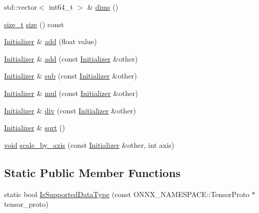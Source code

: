 \begin{DoxyCompactItemize}
std\+::vector$<$ int64\+\_\+t $>$ \& \mbox{\hyperlink{classonnxruntime_1_1Initializer_ab2b877ef9dd53feb7e90397de14be12a}{dims}} ()
\item 
\mbox{\hyperlink{mlasi_8h_a503efbc1c6e50825320ad909366b78ab}{size\+\_\+t}} \mbox{\hyperlink{classonnxruntime_1_1Initializer_a77022bec74ca93ec68e54c85e085c093}{size}} () const
\item 
\mbox{\hyperlink{classonnxruntime_1_1Initializer}{Initializer}} \& \mbox{\hyperlink{classonnxruntime_1_1Initializer_ab26cacacf0f3b221fde86c176bbc97f1}{add}} (float value)
\item 
\mbox{\hyperlink{classonnxruntime_1_1Initializer}{Initializer}} \& \mbox{\hyperlink{classonnxruntime_1_1Initializer_af7ae55957c741495c4520f29ff2381ca}{add}} (const \mbox{\hyperlink{classonnxruntime_1_1Initializer}{Initializer}} \&other)
\item 
\mbox{\hyperlink{classonnxruntime_1_1Initializer}{Initializer}} \& \mbox{\hyperlink{classonnxruntime_1_1Initializer_a20381c51daf3386b459ca6cbbd770fb5}{sub}} (const \mbox{\hyperlink{classonnxruntime_1_1Initializer}{Initializer}} \&other)
\item 
\mbox{\hyperlink{classonnxruntime_1_1Initializer}{Initializer}} \& \mbox{\hyperlink{classonnxruntime_1_1Initializer_a5a782f94351a5873490294817ff9ee04}{mul}} (const \mbox{\hyperlink{classonnxruntime_1_1Initializer}{Initializer}} \&other)
\item 
\mbox{\hyperlink{classonnxruntime_1_1Initializer}{Initializer}} \& \mbox{\hyperlink{classonnxruntime_1_1Initializer_a1f656b26f66cfe3519ab8c33835e97dd}{div}} (const \mbox{\hyperlink{classonnxruntime_1_1Initializer}{Initializer}} \&other)
\item 
\mbox{\hyperlink{classonnxruntime_1_1Initializer}{Initializer}} \& \mbox{\hyperlink{classonnxruntime_1_1Initializer_ab38c8378dfec6df57396dffe19ecdf79}{sqrt}} ()
\item 
\mbox{\hyperlink{mlasi_8h_a88f941d423cb2a819b70a1358982b1a6}{void}} \mbox{\hyperlink{classonnxruntime_1_1Initializer_aa0e2a74cecda48ca39fe9e757bcd5c5e}{scale\+\_\+by\+\_\+axis}} (const \mbox{\hyperlink{classonnxruntime_1_1Initializer}{Initializer}} \&other, int axis)
\end{DoxyCompactItemize}
\subsection*{Static Public Member Functions}
\begin{DoxyCompactItemize}
\item 
static bool \mbox{\hyperlink{classonnxruntime_1_1Initializer_a23b182168184a54bfd33279aade5449c}{Is\+Supported\+Data\+Type}} (const O\+N\+N\+X\+\_\+\+N\+A\+M\+E\+S\+P\+A\+C\+E\+::\+Tensor\+Proto $\ast$tensor\+\_\+proto)
\end{DoxyCompactItemize}


